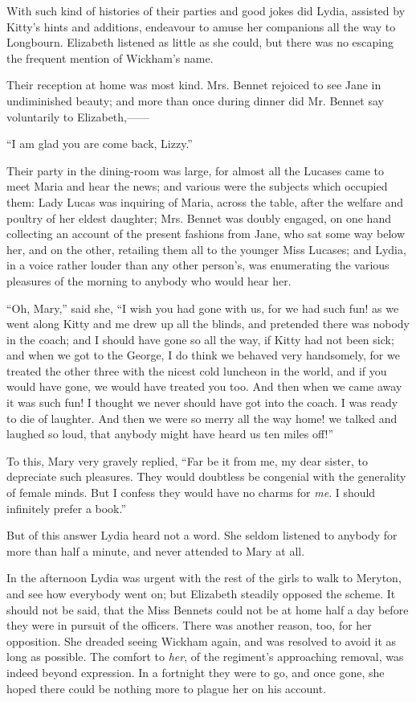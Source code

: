 \documentclass[12pt,openright]{book}
\begin{document}
With such kind of histories of their parties and good jokes did Lydia, assisted by Kitty’s hints and additions, endeavour to amuse her companions all the way to Longbourn. Elizabeth listened as little as she could, but there was no escaping the frequent mention of Wickham’s name.

Their reception at home was most kind. Mrs. Bennet rejoiced to see Jane in undiminished beauty; and more than once during dinner did Mr. Bennet say voluntarily to Elizabeth,——

“I am glad you are come back, Lizzy.”

Their party in the dining-room was large, for almost all the Lucases came to meet Maria and hear the news; and various were the subjects which occupied them: Lady Lucas was inquiring of Maria, across the table, after the welfare and poultry of her eldest daughter; Mrs. Bennet was doubly engaged, on one hand collecting an account of the present fashions from Jane, who sat some way below her, and on the other, retailing them all to the younger Miss Lucases; and Lydia, in a voice rather louder than any other person’s, was enumerating the various pleasures of the morning to anybody who would hear her.

“Oh, Mary,” said she, “I wish you had gone with us, for we had such fun! as we went along Kitty and me drew up all the blinds, and pretended there was nobody in the coach; and I should have gone so all the way, if Kitty had not been sick; and when we got to the George, I do think we behaved very handsomely, for we treated the other three with the nicest cold luncheon in the world, and if you would have gone, we would have treated you too. And then when we came away it was such fun! I thought we never should have got into the coach. I was ready to die of laughter. And then we were so merry all the way home! we talked and laughed so loud, that anybody might have heard us ten miles off!”

To this, Mary very gravely replied, “Far be it from me, my dear sister, to depreciate such pleasures. They would doubtless be congenial with the generality of female minds. But I confess they would have no charms for \textit{me}. I should infinitely prefer a book.”

But of this answer Lydia heard not a word. She seldom listened to anybody for more than half a minute, and never attended to Mary at all.

In the afternoon Lydia was urgent with the rest of the girls to walk to Meryton, and see how everybody went on; but Elizabeth steadily opposed the scheme. It should not be said, that the Miss Bennets could not be at home half a day before they were in pursuit of the officers. There was another reason, too, for her opposition. She dreaded seeing Wickham again, and was resolved to avoid it as long as possible. The comfort to \textit{her}, of the regiment’s approaching removal, was indeed beyond expression. In a fortnight they were to go, and once gone, she hoped there could be nothing more to plague her on his account.
\end{document}
